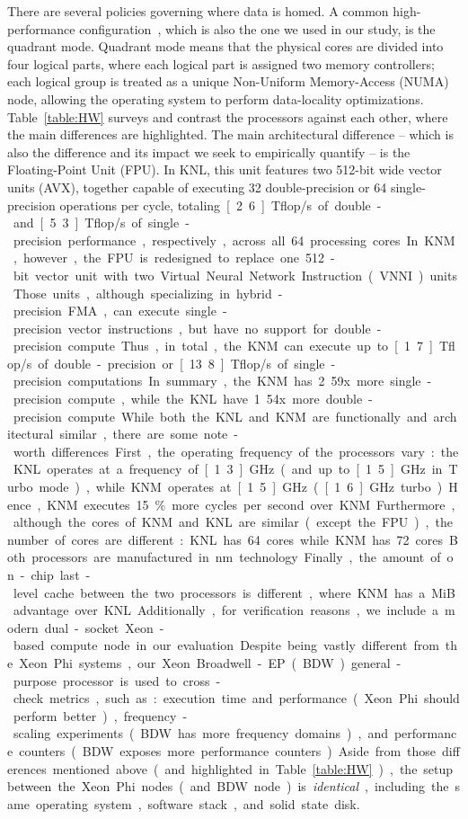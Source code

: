 There are several policies governing where data is homed. A common high-performance configuration~\cite{gawande_scaling_2017}, which is also the one we used in our study, is the quadrant mode. Quadrant mode means that the physical cores are divided into four logical parts, where each logical part is assigned two memory controllers; each logical group is treated as a unique Non-Uniform Memory-Access (NUMA) node, allowing the operating system to perform data-locality optimizations.
Table~\ref{table:HW} surveys and contrast the processors against each other, where the main differences are highlighted. The main architectural difference -- which is also the difference and its impact we seek to empirically quantify -- is the Floating-Point Unit (FPU). In KNL, this unit features two 512-bit wide vector units (AVX), together capable of executing 32 double-precision or 64 single-precision operations per cycle, totaling~\unit[2.6]{Tflop/s} of double- and~\unit[5.3]{Tflop/s} of single-precision performance, respectively, across all 64 processing cores. In KNM, however, the FPU is redesigned to replace one 512-bit vector unit with two Virtual Neural Network Instruction (VNNI) units. Those units, although specializing in hybrid-precision FMA, can execute single-precision vector instructions, but have no support for double-precision compute. Thus, in total, the KNM can execute up to~\unit[1.7]{Tflop/s} of double-precision or~\unit[13.8]{Tflop/s} of single-precision computations. In summary, the KNM has~2.59x more single-precision compute, while the KNL have~1.54x more double-precision compute.

While both the KNL and KNM are functionally and architectural similar, there are some note-worth differences. First, the operating frequency of the processors vary: the KNL operates at a frequency of~\unit[1.3]{GHz} (and up to~\unit[1.5]{GHz} in Turbo mode), while KNM operates at~\unit[1.5]{GHz} (\unit[1.6]{GHz} turbo). Hence, KNM executes~15\% more cycles per second over KNM. Furthermore, although the cores of KNM and KNL are similar (except the FPU), the number of cores are different: KNL has~64 cores while KNM has~72 cores. Both processors are manufactured in~\unit[14]{nm} technology. Finally, the amount of on-chip last-level cache between the two processors is different, where KNM has a~\unit[4]{MiB} advantage over KNL.

Additionally, for verification reasons, we include a modern dual-socket Xeon-based compute node in our evaluation. Despite being vastly different from the Xeon Phi systems, our Xeon Broadwell-EP (BDW) general-purpose processor is used to cross-check metrics, such as: execution time and performance (Xeon Phi should perform better), frequency-scaling experiments (BDW has more frequency domains), and performance counters (BDW exposes more performance counters).
Aside from those differences mentioned above (and highlighted in Table~\ref{table:HW}), the setup between the Xeon Phi nodes (and BDW node) is \textit{identical}, including the same operating system, software stack, and solid state disk. %

